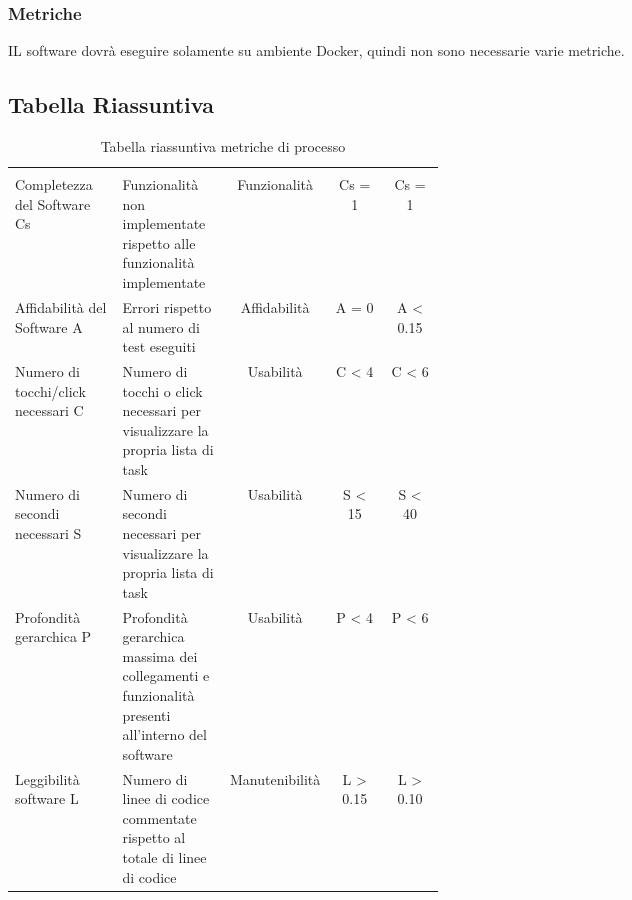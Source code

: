 \subsubsection{Metriche}
IL software dovrà eseguire solamente su ambiente Docker, quindi non sono necessarie varie metriche.
\subsection{Tabella Riassuntiva}
\begin{table}[H]
	\begin{center}
		\caption{Tabella riassuntiva metriche di processo}
		\begin{tabular}{p{0.25\linewidth} p{0.25\linewidth}c!{\color[HTML]{9b240a}\vrule width 0.05cm}cc}
			\rowcolorhead
			 &  &  &  & \\
			
			Completezza del Software Cs & Funzionalità non implementate rispetto alle funzionalità implementate & Funzionalità & Cs = 1 & Cs = 1\\
			Affidabilità del Software A & Errori rispetto al numero di test eseguiti & Affidabilità & A = 0 & A < 0.15\\
			Numero di tocchi/click necessari C & Numero di tocchi o click necessari per visualizzare la propria lista di task & Usabilità & C < 4 & C < 6\\
			Numero di secondi necessari S & Numero di secondi necessari per visualizzare la propria lista di task & Usabilità & S < 15 & S < 40\\
			Profondità gerarchica P & Profondità gerarchica massima dei collegamenti e funzionalità presenti all'interno del software & Usabilità & P < 4 & P < 6\\
			Leggibilità software L & Numero di linee di codice commentate rispetto al totale di linee di codice & Manutenibilità & L > 0.15 & L > 0.10\\	
		\end{tabular}
		
	\end{center}
\end{table}
